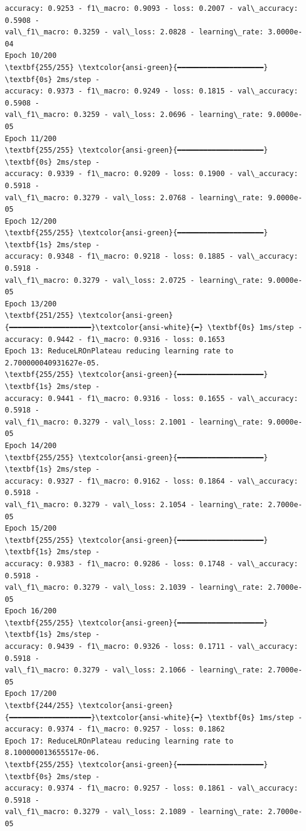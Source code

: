 \documentclass[11pt]{article}
\begin{document}
\begin{Verbatim}[commandchars=\\\{\}]
accuracy: 0.9253 - f1\_macro: 0.9093 - loss: 0.2007 - val\_accuracy: 0.5908 -
val\_f1\_macro: 0.3259 - val\_loss: 2.0828 - learning\_rate: 3.0000e-04
Epoch 10/200
\textbf{255/255} \textcolor{ansi-green}{━━━━━━━━━━━━━━━━━━━━} \textbf{0s} 2ms/step -
accuracy: 0.9373 - f1\_macro: 0.9249 - loss: 0.1815 - val\_accuracy: 0.5908 -
val\_f1\_macro: 0.3259 - val\_loss: 2.0696 - learning\_rate: 9.0000e-05
Epoch 11/200
\textbf{255/255} \textcolor{ansi-green}{━━━━━━━━━━━━━━━━━━━━} \textbf{0s} 2ms/step -
accuracy: 0.9339 - f1\_macro: 0.9209 - loss: 0.1900 - val\_accuracy: 0.5918 -
val\_f1\_macro: 0.3279 - val\_loss: 2.0768 - learning\_rate: 9.0000e-05
Epoch 12/200
\textbf{255/255} \textcolor{ansi-green}{━━━━━━━━━━━━━━━━━━━━} \textbf{1s} 2ms/step -
accuracy: 0.9348 - f1\_macro: 0.9218 - loss: 0.1885 - val\_accuracy: 0.5918 -
val\_f1\_macro: 0.3279 - val\_loss: 2.0725 - learning\_rate: 9.0000e-05
Epoch 13/200
\textbf{251/255} \textcolor{ansi-green}{━━━━━━━━━━━━━━━━━━━}\textcolor{ansi-white}{━} \textbf{0s} 1ms/step -
accuracy: 0.9442 - f1\_macro: 0.9316 - loss: 0.1653
Epoch 13: ReduceLROnPlateau reducing learning rate to 2.700000040931627e-05.
\textbf{255/255} \textcolor{ansi-green}{━━━━━━━━━━━━━━━━━━━━} \textbf{1s} 2ms/step -
accuracy: 0.9441 - f1\_macro: 0.9316 - loss: 0.1655 - val\_accuracy: 0.5918 -
val\_f1\_macro: 0.3279 - val\_loss: 2.1001 - learning\_rate: 9.0000e-05
Epoch 14/200
\textbf{255/255} \textcolor{ansi-green}{━━━━━━━━━━━━━━━━━━━━} \textbf{1s} 2ms/step -
accuracy: 0.9327 - f1\_macro: 0.9162 - loss: 0.1864 - val\_accuracy: 0.5918 -
val\_f1\_macro: 0.3279 - val\_loss: 2.1054 - learning\_rate: 2.7000e-05
Epoch 15/200
\textbf{255/255} \textcolor{ansi-green}{━━━━━━━━━━━━━━━━━━━━} \textbf{1s} 2ms/step -
accuracy: 0.9383 - f1\_macro: 0.9286 - loss: 0.1748 - val\_accuracy: 0.5918 -
val\_f1\_macro: 0.3279 - val\_loss: 2.1039 - learning\_rate: 2.7000e-05
Epoch 16/200
\textbf{255/255} \textcolor{ansi-green}{━━━━━━━━━━━━━━━━━━━━} \textbf{1s} 2ms/step -
accuracy: 0.9439 - f1\_macro: 0.9326 - loss: 0.1711 - val\_accuracy: 0.5918 -
val\_f1\_macro: 0.3279 - val\_loss: 2.1066 - learning\_rate: 2.7000e-05
Epoch 17/200
\textbf{244/255} \textcolor{ansi-green}{━━━━━━━━━━━━━━━━━━━}\textcolor{ansi-white}{━} \textbf{0s} 1ms/step -
accuracy: 0.9374 - f1\_macro: 0.9257 - loss: 0.1862
Epoch 17: ReduceLROnPlateau reducing learning rate to 8.100000013655517e-06.
\textbf{255/255} \textcolor{ansi-green}{━━━━━━━━━━━━━━━━━━━━} \textbf{0s} 2ms/step -
accuracy: 0.9374 - f1\_macro: 0.9257 - loss: 0.1861 - val\_accuracy: 0.5918 -
val\_f1\_macro: 0.3279 - val\_loss: 2.1089 - learning\_rate: 2.7000e-05

\end{Verbatim}
\end{document}
